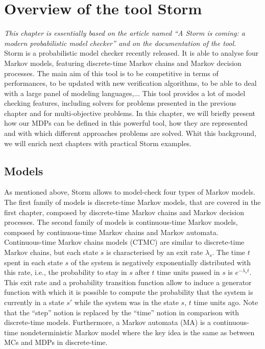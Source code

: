 \chapter{Overview of the tool Storm}
\textit{This chapter is essentially based on the article named ``A Storm is coming: a modern probabilistic model checker'' \cite{storm1} and on the documentation of the tool.} \\

Storm is a probabilistic model checker recently released. It is able to analyse
four Markov models, featuring discrete-time Markov chains and Markov decision processes. The main aim of this tool is to be competitive in terms of performances, to be updated with new verification algorithms, to be able to
deal with a large panel of modeling languages,... This tool provides %
a lot of model checking features, including solvers for problems presented in the previous chapter and
for multi-objective problems. In this chapter, we will briefly present how our MDPs can be defined in this powerful tool, how they are represented and with which different approaches problems are solved.
Whit this background, we will enrich next chapters with practical Storm examples.

\section{Models}
As mentioned above, Storm allows to model-check four types of Markov models.
The first family of models is discrete-time Markov models, that are covered in the first chapter, composed by
discrete-time Markov chains and Markov decision processes.
The second family of models is continuous-time Markov models, composed by continuous-time Markov chains and Markov automata. \\

Continuous-time Markov chains models (CTMC) \cite{maro} are similar to discrete-time Markov chains, but each state $s$ is
characterised by an exit rate $\lambda_s$.
The time $t$ spent in each state $s$ of the system is negatively exponentially distributed with this rate, i.e., the probability to stay in $s$ after $t$ time units passed in $s$ is $e^{- \lambda_s t}$.
This exit rate and a probability transition function allow to induce a generator
function with which it is possible to compute the probability
that the system is currently in a state $s'$ while the system was in the state $s$, $t$ time units ago.
Note that the ``step'' notion is replaced by the ``time'' notion in comparison with discrete-time models. Furthermore, a Markov automata (MA) is a continuous-time nondeterministic Markov model where the key idea is the same as between MCs and MDPs in discrete-time. \\

